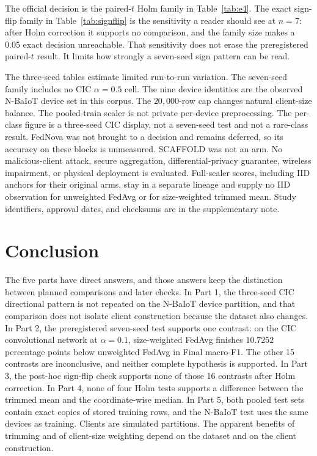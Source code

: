 \documentclass{ieeeaccess}
\begin{document}
The official decision is the paired-$t$ Holm family in Table~\ref{tab:e4}. The exact sign-flip family in Table~\ref{tab:signflip} is the sensitivity a reader should see at $n=7$: after Holm correction it supports no comparison, and the family size makes a $0.05$ exact decision unreachable. That sensitivity does not erase the preregistered paired-$t$ result. It limits how strongly a seven-seed sign pattern can be read.

The three-seed tables estimate limited run-to-run variation. The seven-seed family includes no CIC $\alpha=0.5$ cell. The nine device identities are the observed N-BaIoT device set in this corpus. The $20{,}000$-row cap changes natural client-size balance. The pooled-train scaler is not private per-device preprocessing. The per-class figure is a three-seed CIC display, not a seven-seed test and not a rare-class result. FedNova was not brought to a decision and remains deferred, so its accuracy on these blocks is unmeasured. SCAFFOLD was not an arm. No malicious-client attack, secure aggregation, differential-privacy guarantee, wireless impairment, or physical deployment is evaluated. Full-scaler scores, including IID anchors for their original arms, stay in a separate lineage and supply no IID observation for unweighted FedAvg or for size-weighted trimmed mean. Study identifiers, approval dates, and checksums are in the supplementary note.

\section{Conclusion}
The five parts have direct answers, and those answers keep the distinction between planned comparisons and later checks. In Part 1, the three-seed CIC directional pattern is not repeated on the N-BaIoT device partition, and that comparison does not isolate client construction because the dataset also changes. In Part 2, the preregistered seven-seed test supports one contrast: on the CIC convolutional network at $\alpha=0.1$, size-weighted FedAvg finishes $10.7252$ percentage points below unweighted FedAvg in Final macro-F1. The other 15 contrasts are inconclusive, and neither complete hypothesis is supported. In Part 3, the post-hoc sign-flip check supports none of those 16 contrasts after Holm correction. In Part 4, none of four Holm tests supports a difference between the trimmed mean and the coordinate-wise median. In Part 5, both pooled test sets contain exact copies of stored training rows, and the N-BaIoT test uses the same devices as training. Clients are simulated partitions. The apparent benefits of trimming and of client-size weighting depend on the dataset and on the client construction.
\end{document}

